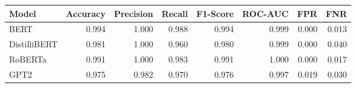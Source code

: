 \begin{tabular}{|l||r|r|r|r|r|r|r|}
\toprule
Model & \textbf{Accuracy} & \textbf{Precision} & Recall & \textbf{F1-Score} & \textbf{ROC-AUC} & \textbf{FPR} & FNR \\
\midrule \midrule
BERT & 0.994 & 1.000 & 0.988 & 0.994 & 0.999 & 0.000 & 0.013 \\
DistilliBERT & 0.981 & 1.000 & 0.960 & 0.980 & 0.999 & 0.000 & 0.040 \\
RoBERTa & 0.991 & 1.000 & 0.983 & 0.991 & 1.000 & 0.000 & 0.017 \\
GPT2 & 0.975 & 0.982 & 0.970 & 0.976 & 0.997 & 0.019 & 0.030 \\
\bottomrule
\end{tabular}
